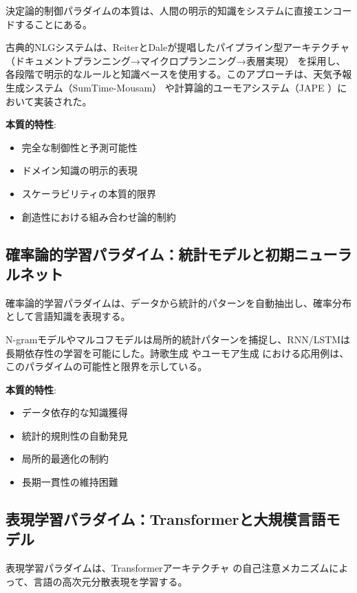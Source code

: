 \documentclass[11pt, a4paper]{article}
\begin{document}
決定論的制御パラダイムの本質は、人間の明示的知識をシステムに直接エンコードすることにある。

古典的NLGシステムは、ReiterとDaleが提唱したパイプライン型アーキテクチャ（ドキュメントプランニング→マイクロプランニング→表層実現）\cite{ReiterDale2000BuildingNatural} を採用し、各段階で明示的なルールと知識ベースを使用する。このアプローチは、天気予報生成システム（SumTime-Mousam）\cite{ReiterDale1997ChoosingWords} や計算論的ユーモアシステム（JAPE \cite{BinstedRitchie1994JAPEA}）において実装された。

\textbf{本質的特性}:
\begin{itemize}[noitemsep,topsep=0pt]
    \item 完全な制御性と予測可能性
    \item ドメイン知識の明示的表現
    \item スケーラビリティの本質的限界
    \item 創造性における組み合わせ論的制約
\end{itemize}

\subsection{確率論的学習パラダイム：統計モデルと初期ニューラルネット}

確率論的学習パラダイムは、データから統計的パターンを自動抽出し、確率分布として言語知識を表現する。

N-gramモデルやマルコフモデルは局所的統計パターンを捕捉し、RNN/LSTMは長期依存性の学習を可能にした。詩歌生成 \cite{ZhangLapata2014ChinesePoetry, GhazvininejadEtAl2016GeneratingTopical} やユーモア生成 \cite{PetrovicMatthews2013UnsupervisedDetection} における応用例は、このパラダイムの可能性と限界を示している。

\textbf{本質的特性}:
\begin{itemize}[noitemsep,topsep=0pt]
    \item データ依存的な知識獲得
    \item 統計的規則性の自動発見
    \item 局所的最適化の制約
    \item 長期一貫性の維持困難
\end{itemize}

\subsection{表現学習パラダイム：Transformerと大規模言語モデル}

表現学習パラダイムは、Transformerアーキテクチャ \cite{VaswaniEtAl2017AttentionIs} の自己注意メカニズムによって、言語の高次元分散表現を学習する。
\end{document}
